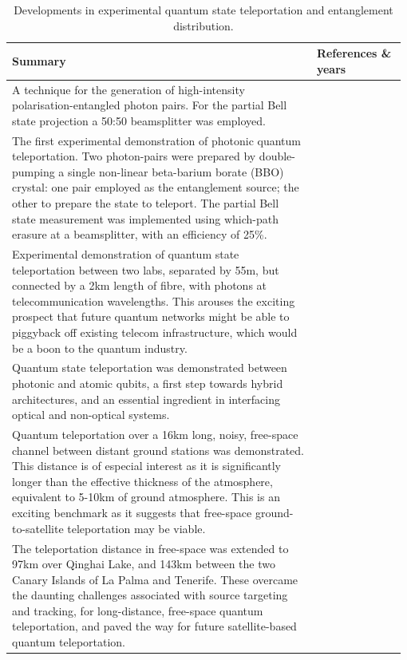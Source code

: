 \documentclass[aps, rmp, twocolumn, amsmath, amssymb, nofootinbib, superscriptaddress, longbibliography, floatfix, table-of-contents, eqsecnum]{revtex4-1}
\begin{document}
\begin{table}[!htb]
\caption{Developments in experimental quantum state teleportation and entanglement distribution.} \label{tab:state_tomo}
\begin{tabular}{|p{0.755\linewidth}|p{0.22\linewidth}|}
	\hline
	Summary & References \& years \\
	\hline \hline
	A technique for the generation of high-intensity polarisation-entangled photon pairs. For the partial Bell state projection a 50:50 beamsplitter was employed. & \cite{kwiat1995new, bib:Euro_25_559} \\
	\hline
	The first experimental demonstration of photonic quantum teleportation. Two photon-pairs were prepared by double-pumping a single non-linear beta-barium borate (BBO) crystal: one pair employed as the entanglement source; the other to prepare the state to teleport. The partial Bell state measurement was implemented using which-path erasure at a beamsplitter, with an efficiency of 25\%. & \cite{bib:Boumeester97} \\
	\hline
	Experimental demonstration of quantum state teleportation between two labs, separated by 55m, but connected by a 2km length of fibre, with photons at telecommunication wavelengths. This arouses the exciting prospect that future quantum networks might be able to piggyback off existing telecom infrastructure, which would be a boon to the quantum industry. & \cite{bib:Nat_421_509} \\
	\hline
	Quantum state teleportation was demonstrated between photonic and atomic qubits, a first step towards hybrid architectures, and an essential ingredient in interfacing optical and non-optical systems. & \cite{bib:Chen08} \\
	\hline
	Quantum teleportation over a 16km long, noisy, free-space channel between distant ground stations was demonstrated. This distance is of especial interest as it is significantly longer than the effective thickness of the atmosphere, equivalent to 5-10km of ground atmosphere. This is an exciting benchmark as it suggests that free-space ground-to-satellite teleportation may be viable. & \cite{bib:Nat_Phot_4_376, bib:PRL_94_150501} \\
	\hline
	The teleportation distance in free-space was extended to 97km over Qinghai Lake, and 143km between the two Canary Islands of La Palma and Tenerife. These overcame the daunting challenges associated with source targeting and tracking, for long-distance, free-space quantum teleportation, and paved the way for future satellite-based quantum teleportation. & \cite{bib:Nat_488_185, bib:Nat_489_269} \\

\end{tabular}
\end{table}
\end{document}
